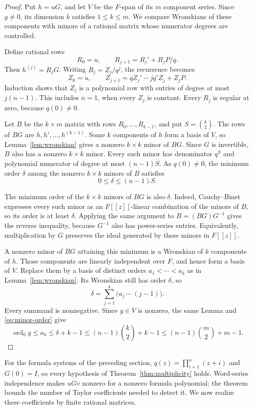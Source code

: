 \begin{proof}
Put $h=uG$, and let $V$ be the $F$-span of its $m$ component series.
Since $y\ne0$, its dimension $k$ satisfies $1\le k\le m$.
We compare Wronskians of these components with minors of a rational
matrix whose numerator degrees are controlled.

Define rational rows
\[
 R_0=u,\qquad R_{j+1}=R_j'+R_jP/q.
\]
Then $h^{(j)}=R_jG$.  Writing $R_j=Z_j/q^j$, the recurrence becomes
\[
 Z_0=u,\qquad
 Z_{j+1}=qZ_j'-jq'Z_j+Z_jP.
\]
Induction shows that $Z_j$ is a polynomial row with entries of degree
at most $j(n-1)$.  This includes $n=1$, when every $Z_j$ is constant.
Every $R_j$ is regular at zero, because $q(0)\ne0$.

Let $B$ be the $k\times m$ matrix with rows
$R_0,\ldots,R_{k-1}$, and put $S=\binom{k}{2}$.
The rows of $BG$ are $h,h',\ldots,h^{(k-1)}$.
Some $k$ components of $h$ form a basis of $V$, so
Lemma~\ref{lem:wronskian} gives a nonzero $k\times k$ minor of $BG$.
Since $G$ is invertible, $B$ also has a nonzero $k\times k$ minor.
Every such minor has denominator $q^S$ and polynomial numerator of
degree at most $(n-1)S$.  As $q(0)\ne0$, the minimum order $\delta$
among the nonzero $k\times k$ minors of $B$ satisfies
\begin{equation}\label{eq:minor-order}
 0\le\delta\le(n-1)S.
\end{equation}

The minimum order of the $k\times k$ minors of $BG$ is also $\delta$.
Indeed, Cauchy--Binet expresses every such minor as an $F[[z]]$-linear
combination of the minors of $B$, so its order is at least $\delta$.
Applying the same argument to $B=(BG)G^{-1}$ gives the reverse
inequality, because $G^{-1}$ also has power-series entries.
Equivalently, multiplication by $G$ preserves the ideal generated by
these minors in $F[[z]]$.

A nonzero minor of $BG$ attaining this minimum is a Wronskian of $k$
components of $h$.  Those components are linearly independent over
$F$, and hence form a basis of $V$.  Replace them by a basis of distinct
orders $a_1<\cdots<a_k$ as in Lemma~\ref{lem:wronskian}.  Its Wronskian
still has order $\delta$, so
\[
 \delta=\sum_{j=1}^k\bigl(a_j-(j-1)\bigr).
\]
Every summand is nonnegative.  Since $y\in V$ is nonzero, the same
Lemma and \eqref{eq:minor-order} give
\[
 \operatorname{ord}_0 y\le a_k
 \le\delta+k-1
 \le(n-1)\binom{k}{2}+k-1
 \le(n-1)\binom{m}{2}+m-1.
\]
\end{proof}

For the formula systems of the preceding section,
$q(z)=\prod_{i=1}^n(z+i)$ and $G(0)=I$, so every hypothesis of
Theorem~\ref{thm:multiplicity} holds.  Word-series independence makes
$uGv$ nonzero for a nonzero formula polynomial; the theorem bounds the
number of Taylor coefficients needed to detect it.  We now realize
these coefficients by finite rational matrices.
